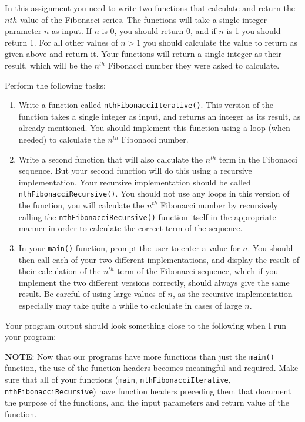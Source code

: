 \documentclass[11pt]{article}
\begin{document}
In this assignment you need to write two functions that calculate
and return the $nth$ value of the Fibonacci series.  The functions
will take a single integer parameter $n$ as input.  If $n$ is 0, you
should return 0, and if $n$ is 1 you should return 1.  For all other
values of $n>1$ you should calculate the value to return as given
above and return it.  Your functions will return a single integer
as their result, which will be the $n^{th}$ Fibonacci number they
were asked to calculate.

Perform the following tasks:

\begin{enumerate}
\item Write a function called \verb~nthFibonacciIterative()~.  This version of
   the function takes a single integer as input, and returns an
   integer as its result, as already mentioned.  You should implement
   this function using a loop (when needed) to calculate the $n^{th}$
   Fibonacci number.
\item Write a second function that will also calculate the $n^{th}$ term
   in the Fibonacci sequence.  But your second function will do this
   using a recursive implementation.  Your recursive implementation
   should be called \verb~nthFibonacciRecursive()~.  You should not use any
   loops in this version of the function, you will calculate the
   $n^{th}$ Fibonacci number by recursively calling the
   \verb~nthFibonacciRecursive()~ function itself in the appropriate manner
   in order to calculate the correct term of the sequence.
\item In your \verb~main()~ function, prompt the user to enter a value for $n$.
   You should then call each of your two different implementations, and
   display the result of their calculation of the $n^{th}$ term of the
   Fibonacci sequence, which if you implement the two different versions
   correctly, should always give the same result.  Be careful of using
   large values of $n$, as the recursive implementation especially may
   take quite a while to calculate in cases of large $n$.
\end{enumerate}

Your program output should look something close to the following when I
run your program:



\textbf{NOTE}: Now that our programs have more functions than just the
\verb~main()~ function, the use of the function headers becomes meaningful
and required.  Make sure that all of your functions (\verb~main~,
\verb~nthFibonacciIterative~, \verb~nthFibonacciRecursive~) have function
headers preceding them that document the purpose of the functions, and
the input parameters and return value of the function.
\end{document}

